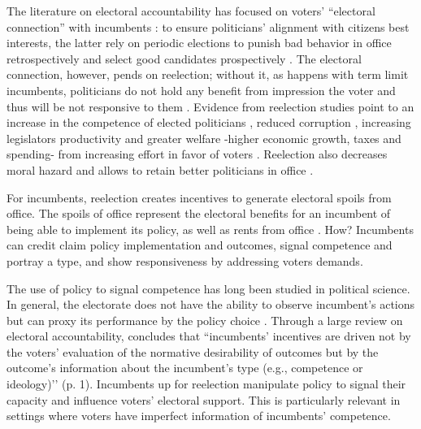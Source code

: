 \documentclass[12pt]{amsart}
\numberwithin{equation}{section}
\theoremstyle{definition}
\theoremstyle{definition}
\theoremstyle{definition}
\begin{document}


The literature on electoral accountability has focused on voters' ``electoral connection''  with incumbents \citep{mayhew_1974}: to ensure politicians' alignment with citizens best interests, the latter rely on periodic elections to punish bad behavior in office retrospectively and select good candidates prospectively \citep{manin_etal_1999}. The electoral connection, however, pends on reelection; without it, as happens with term limit incumbents, politicians do not hold any benefit from impression the voter and thus will be not responsive to them \citep{ashworth_2012}. Evidence from reelection studies point to an increase in the competence of elected politicians \citep{dalbo_etal_2017}, reduced corruption \citep{ferraz_finan_2011}, increasing legislators productivity \citep{hall_etal_2018} and greater welfare -higher economic growth, taxes and spending- from increasing effort in favor of voters \citep{alt_etal_2011}. Reelection also decreases moral hazard and allows to retain better politicians in office \citep{smart_sturm_2013}.      

For incumbents, reelection creates incentives to generate electoral spoils from office. The spoils of office represent the electoral benefits for an incumbent of being able to implement its policy, as well as rents from office \citep{lizzeri_2001}.
How? Incumbents can credit claim policy implementation and outcomes, signal competence and portray a type, and show responsiveness by addressing voters demands.

The use of policy to signal competence has long been studied in political science. In general, the electorate does not have the ability to observe incumbent’s actions but can proxy its performance by the policy choice \citep{ferejohn_1986}. Through a large review on electoral accountability, \citet{ashworth_2012} concludes that ``incumbents’ incentives are driven not by the voters’ evaluation of the normative desirability of outcomes but by the outcome’s information about the incumbent’s type (e.g., competence or ideology)’’ (p. 1). Incumbents up for reelection manipulate policy to signal their capacity and influence voters’ electoral support. This is particularly relevant in settings where voters have imperfect information of incumbents’ competence.
\end{document}
